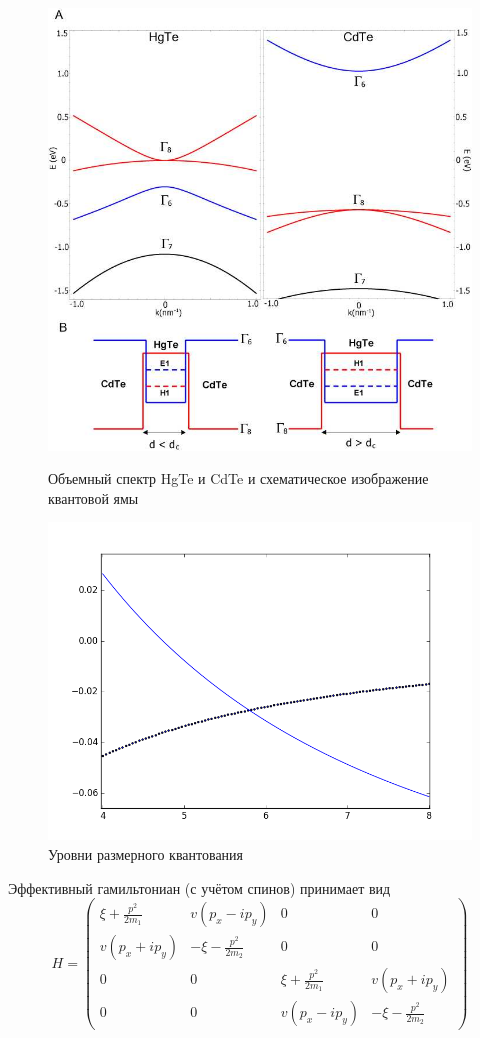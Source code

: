 \begin{figure}[h]
    \centering
    \begin{minipage}[t]{0.45\textwidth}
        \includegraphics[width=0.9\linewidth]{quantum_well.png}
        \caption{Объемный спектр HgTe и CdTe и 
                 схематическое изображение квантовой ямы}
    \end{minipage}
    \hfill
    \begin{minipage}[t]{0.45\textwidth}
        \includegraphics[width=0.9\linewidth]{levels.png}
        \caption{Уровни размерного квантования}
    \end{minipage}
\end{figure}

Эффективный гамильтониан (с учётом спинов) принимает вид
\begin{equation}
    H = \begin{pmatrix}
            \xi + \frac{p^2}{2m_1} & v(p_x - ip_y) & 0 & 0 \\
            v(p_x + ip_y) & -\xi - \frac{p^2}{2m_2}& 0 & 0 \\
            0 & 0 & \xi + \frac{p^2}{2m_1} & v(p_x + ip_y) \\
            0 &  0 &  v(p_x - ip_y) & -\xi - \frac{p^2}{2m_2}
        \end{pmatrix}
\end{equation}
